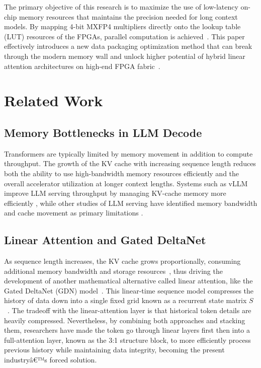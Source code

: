 ﻿\documentclass[conference]{IEEEtran}
\begin{document}
The primary objective of this research is to maximize the use of low-latency on-chip memory resources that maintains the precision needed for long context models. By mapping 4-bit MXFP4 multipliers directly onto the lookup table (LUT) resources of the FPGAs, parallel computation is achieved~\cite{b12}. This paper effectively introduces a new data packaging optimization method that can break through the modern memory wall and unlock higher potential of hybrid linear attention architectures on high-end FPGA fabric~\cite{b5}.

\section{Related Work}

\subsection{Memory Bottlenecks in LLM Decode}
Transformers are typically limited by memory movement in addition to compute throughput. The growth of the KV cache with increasing sequence length reduces both the ability to use high-bandwidth memory resources efficiently and the overall accelerator utilization at longer context lengths. Systems such as vLLM improve LLM serving throughput by managing KV-cache memory more efficiently \cite{b4}, while other studies of LLM serving have identified memory bandwidth and cache movement as primary limitations \cite{b1,b7}.

\subsection{Linear Attention and Gated DeltaNet}
As sequence length increases, the KV cache grows proportionally, consuming additional memory bandwidth and storage resources~\cite{b7}, thus driving the development of another mathematical alternative called linear attention, like the Gated DeltaNet (GDN) model~\cite{b3}. This linear-time sequence model compresses the history of data down into a single fixed grid known as a recurrent state matrix $S$~\cite{b3}. The tradeoff with the linear-attention layer is that historical token details are heavily compressed. Nevertheless, by combining both approaches and stacking them, researchers have made the token go through linear layers first then into a full-attention layer, known as the 3:1 structure block, to more efficiently process previous history while maintaining data integrity, becoming the present industryâ€™s forced solution.
\end{document}
